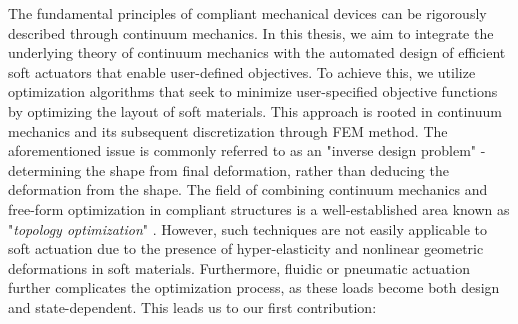 The fundamental principles of compliant mechanical devices can be rigorously described through continuum mechanics. In this thesis, we aim to integrate the underlying theory of continuum mechanics with the automated design of efficient soft actuators that enable user-defined objectives. To achieve this, we utilize optimization algorithms that seek to minimize user-specified objective functions by optimizing the layout of soft materials. This approach is rooted in continuum mechanics \cite{Holzapfel2002,Kim2018} and its subsequent discretization through FEM method. The aforementioned issue is commonly referred to as an "inverse design problem" - determining the shape from final deformation, rather than deducing the deformation from the shape. The field of combining continuum mechanics and free-form optimization in compliant structures is a well-established area known as "\emph{topology optimization}" \cite{Bendsoe2003}. However, such techniques are not easily applicable to soft actuation due to the presence of hyper-elasticity and nonlinear geometric deformations in soft materials. Furthermore, fluidic or pneumatic actuation further complicates the optimization process, as these loads become both design and state-dependent. This leads us to our first contribution:

